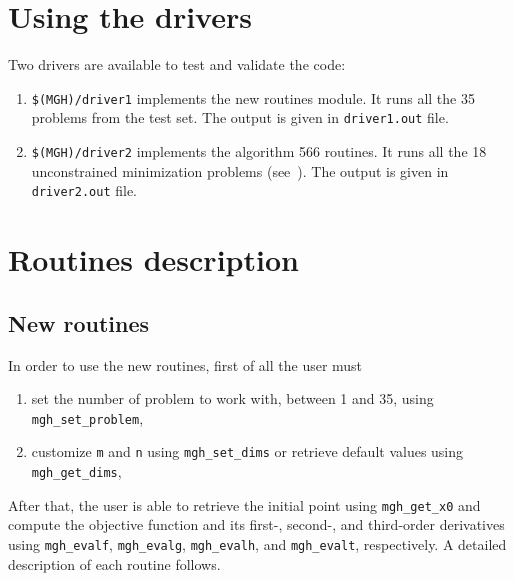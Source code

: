 \documentclass[11pt]{article}
\begin{document}
\section{Using the drivers}

Two drivers are available to test and validate the code:

\begin{enumerate}

\item \verb|$(MGH)/driver1| implements the new routines module. It
  runs all the 35 problems from the test set. The output is given in
  \verb|driver1.out| file.

\item \verb|$(MGH)/driver2| implements the algorithm 566 routines. It
  runs all the 18 unconstrained minimization problems
  (see~\cite{mgh}). The output is given in \verb|driver2.out| file.

\end{enumerate}

\section{Routines description}

\subsection{New routines}
\label{sec:nr}

In order to use the new routines, first of all the user must
\begin{enumerate}
\item set the number of problem to work with, between 1 and 35, using \verb|mgh_set_problem|,

\item customize \verb|m| and \verb|n| using \verb|mgh_set_dims| or
  retrieve default values using \verb|mgh_get_dims|,
\end{enumerate}
After that, the user is able to retrieve the initial point using
\verb|mgh_get_x0| and compute the objective function and its first-,
second-, and third-order derivatives using \verb|mgh_evalf|,
\verb|mgh_evalg|, \verb|mgh_evalh|, and \verb|mgh_evalt|,
respectively. A detailed description of each routine follows.
\end{document}
